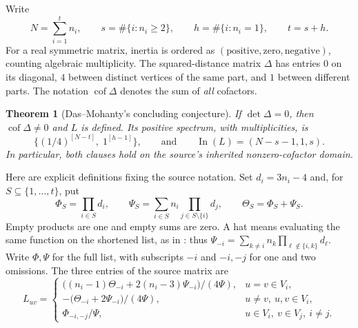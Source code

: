 \documentclass[11pt]{article}
\newtheorem{theorem}{Theorem}
\newcommand{\In}{\operatorname{In}}
\newcommand{\cof}{\operatorname{cof}}
\begin{document}
Write
\[
 N=\sum_{i=1}^t n_i,\qquad
 s=\#\{i:n_i\geq2\},\qquad h=\#\{i:n_i=1\},\qquad t=s+h.
\]
For a real symmetric matrix, inertia is ordered as
$(\text{positive},\text{zero},\text{negative})$, counting algebraic multiplicity.
The squared-distance matrix $\Delta$ has entries $0$ on its diagonal,
$4$ between distinct vertices of the same part, and $1$ between different parts.
The notation $\cof\Delta$ denotes the sum of \emph{all} cofactors.

\begin{theorem}[Das--Mohanty's concluding conjecture]\label{thm:main}
If $\det\Delta=0$, then $\cof\Delta\ne0$ and $L$ is defined.
Its positive spectrum, with multiplicities, is
\[
 \{(1/4)^{[N-t]},\;1^{[h-1]}\},
 \qquad\text{and}\qquad \In(L)=(N-s-1,1,s).
\]
In particular, both clauses hold on the source's inherited
nonzero-cofactor domain.
\end{theorem}

Here are explicit definitions fixing the source notation. Set $d_i=3n_i-4$ and,
for $S\subseteq\{1,\ldots,t\}$, put
\[
 \Phi_S=\prod_{i\in S}d_i,\qquad
 \Psi_S=\sum_{i\in S} n_i\prod_{j\in S\setminus\{i\}}d_j,
 \qquad \Theta_S=\Phi_S+\Psi_S.
\]
Empty products are one and empty sums are zero. A hat means evaluating the
same function on the shortened list, as in \cite[Lemma~3.1(d)]{DM24}:
thus $\Psi_{-i}=\sum_{k\ne i}n_k\prod_{\ell\notin\{i,k\}}d_\ell$.
Write $\Phi,\Psi$ for the full list, with subscripts $-i$ and $-i,-j$
for one and two omissions.
The three entries of the source matrix are
\begin{equation}\label{eq:source}
 L_{uv}=\begin{cases}
 \bigl((n_i-1)\Theta_{-i}+2(n_i-3)\Psi_{-i}\bigr)/(4\Psi),
       &u=v\in V_i,\\
 -\bigl(\Theta_{-i}+2\Psi_{-i}\bigr)/(4\Psi),
       &u\ne v,\ u,v\in V_i,\\
 \Phi_{-i,-j}/\Psi,&u\in V_i,\ v\in V_j,\ i\ne j.
 \end{cases}
\end{equation}
\end{document}
